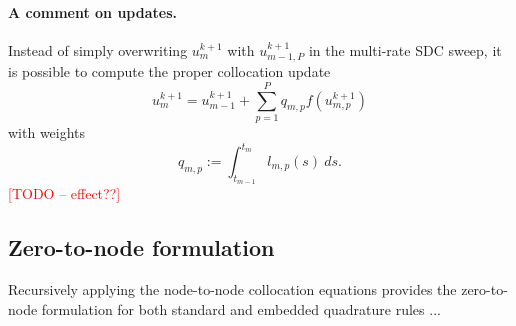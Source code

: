 \documentclass{article}
\newcommand{\todo}[1]{\textcolor{red}{[TODO -- #1]}}
\begin{document}
\paragraph{A comment on updates.}
Instead of simply overwriting $u^{k+1}_{m}$ with $u^{k+1}_{m-1,P}$ in the multi-rate SDC sweep, it is possible to compute the proper collocation update
\begin{equation}
	u^{k+1}_{m} = u^{k+1}_{m-1} + \sum_{p=1}^{P} q_{m, p} f(u^{k+1}_{m,p})
\end{equation}
with weights
\begin{equation}
	q_{m,p} := \int_{t_{m-1}}^{t_{m}} l_{m,p}(s)~ds.
\end{equation}
\todo{effect??}

\subsection*{Zero-to-node formulation}
Recursively applying the node-to-node collocation equations provides the zero-to-node formulation for both standard and embedded quadrature rules
...
\end{document}
